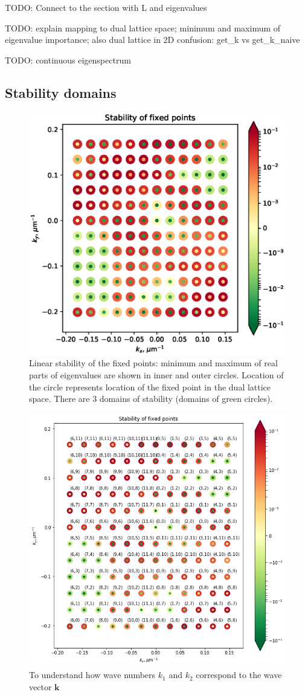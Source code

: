 \documentclass[a4paper,12pt]{article}
\renewcommand*{\vec}[1]{\mathbf{#1}}
\begin{document}
TODO: Connect to the section with L and eigenvalues

TODO: explain mapping to dual lattice space; minimum and maximum of eigenvalue importance; also dual lattice in 2D confusion: get\_k vs get\_k\_naive

TODO: continuous eigenspectrum

\subsection{Stability domains}

\begin{figure}[h]
    \centering
    \includegraphics[width=.6\textwidth]{assets/theory-2019-09-05-124002319-236.eps}
    \caption{Linear stability of the fixed points: minimum and maximum of real parts of eigenvalues are shown in inner and outer circles. Location of the circle represents location of the fixed point in the dual lattice space. There are 3 domains of stability (domains of green circles).}
\end{figure}

\begin{figure}[h]
    \centering
    \includegraphics[width=.6\textwidth]{assets/m-twist-map.png}
    \caption{To understand how wave numbers $k_1$ and $k_2$ correspond to the wave vector $\vec{k}$}
\end{figure}
\end{document}
